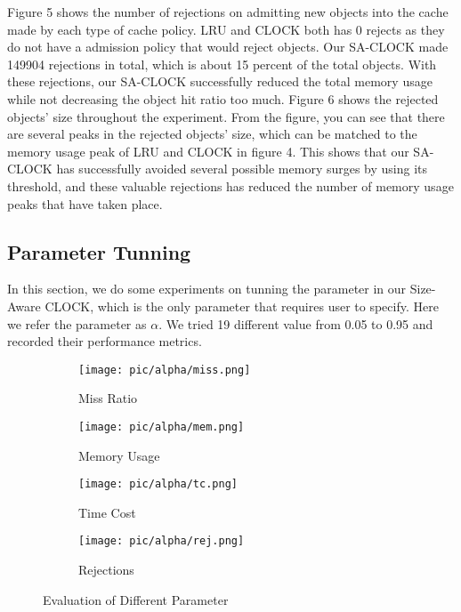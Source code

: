 \documentclass[conference]{IEEEtran}
\begin{document}
Figure 5 shows the number of rejections on admitting new objects into the cache made by each type of cache policy. LRU and CLOCK both has 0 rejects as they do not have a admission policy that would reject objects. Our SA-CLOCK made 149904 rejections in total, which is about 15 percent of the total objects. With these rejections, our SA-CLOCK successfully reduced the total memory usage while not decreasing the object hit ratio too much.
Figure 6 shows the rejected objects' size throughout the experiment. From the figure, you can see that there are several peaks in the rejected objects' size, which can be matched to the memory usage peak of LRU and CLOCK in figure 4. This shows that our SA-CLOCK has successfully avoided several possible memory surges by using its threshold, and these valuable rejections has reduced the number of memory usage peaks that have taken place. 


\subsection{Parameter Tunning}
In this section, we do some experiments on tunning the parameter in our Size-Aware CLOCK, which is the only parameter that requires user to specify. Here we refer the parameter as $\alpha$. We tried 19 different value from 0.05 to 0.95 and recorded their performance metrics.

\begin{figure}
  \centering
  \begin{subfigure}[h]{0.4\textwidth}
    \texttt{[image: pic/alpha/miss.png]}
    \caption{Miss Ratio}
    \label{fig:sub1}
  \end{subfigure}
  \hfill
  \begin{subfigure}[h]{0.4\textwidth}
    \texttt{[image: pic/alpha/mem.png]}
    \caption{Memory Usage}
    \label{fig:sub2}
  \end{subfigure}
  
  \medskip
  
  \begin{subfigure}[h]{0.4\textwidth}
    \texttt{[image: pic/alpha/tc.png]}
    \caption{Time Cost}
    \label{fig:sub3}
  \end{subfigure}
  \hfill
  \begin{subfigure}[h]{0.4\textwidth}
    \texttt{[image: pic/alpha/rej.png]}
    \caption{Rejections}
    \label{fig:sub4}
  \end{subfigure}
  
  \caption{Evaluation of Different Parameter}
  \label{fig:main} 
\end{figure}
\end{document}
